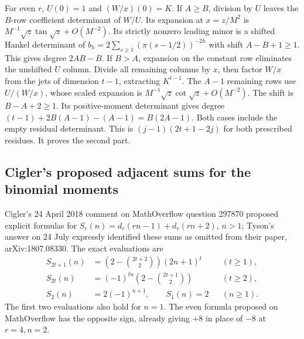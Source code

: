 \documentclass[11pt,a4paper]{article}
\begin{document}
For even $r$, $U(0)=1$ and $(W/x)(0)=K$. If $A\ge B$, division by $U$ leaves the $B$-row coefficient determinant of $W/U$. Its expansion at $x=z/M^2$ is $M^{-1}\sqrt z\tan\sqrt z+O(M^{-2})$. Its strictly nonzero leading minor is a shifted Hankel determinant of $b_h=2\sum_{s\ge1}(\pi(s-1/2))^{-2h}$ with shift $A-B+1\ge1$. This gives degree $2AB-B$. If $B>A$, expansion on the constant row eliminates the unshifted $U$ column. Divide all remaining columns by $x$, then factor $W/x$ from the jets of dimension $t-1$, extracting $K^{t-1}$. The $A-1$ remaining rows use $U/(W/x)$, whose scaled expansion is $M^{-1}\sqrt z\cot\sqrt z+O(M^{-2})$. The shift is $B-A+2\ge1$. Its positive-moment determinant gives degree $(t-1)+2B(A-1)-(A-1)=B(2A-1)$. Both cases include the empty residual determinant. This is $(j-1)(2t+1-2j)$ for both prescribed residues. It proves the second part.

\subsection*{Cigler's proposed adjacent sums for the binomial moments}
Cigler's 24 April 2018 comment on MathOverflow question 297870 \cite{MO18} proposed explicit formulas for $S_r(n)=d_r(rn-1)+d_r(rn+2)$, $n>1$; Tyson's answer on 24 July expressly identified these sums as omitted from their paper, arXiv:1807.08330. The exact evaluations are
\[
\begin{aligned}
 S_{2t+1}(n)&=\left(2-\binom{2t+2}{2}\right)(2n+1)^t &&(t\ge1),\\
 S_{2t}(n)&=(-1)^{tn}\left(2-\binom{2t+1}{2}\right) &&(t\ge2),\\
 S_2(n)&=2(-1)^{n+1},\qquad S_1(n)=2 &&(n\ge1).
\end{aligned}
\]
The first two evaluations also hold for $n=1$. The even formula proposed on MathOverflow has the opposite sign, already giving $+8$ in place of $-8$ at $r=4,n=2$.
\end{document}

